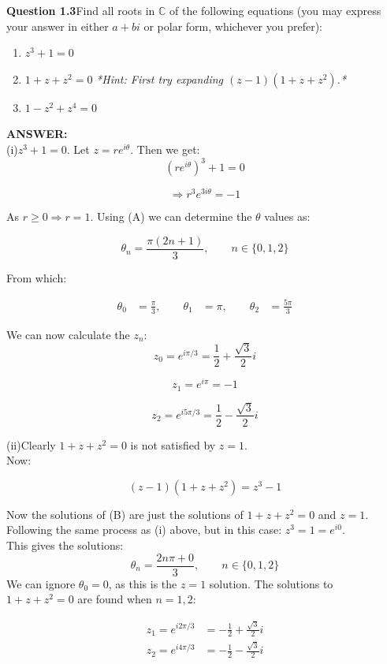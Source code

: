 \documentclass[12pt,a4paper]{article}
\newcommand{\answer}{\vspace{3\baselineskip}\textbf{ANSWER:}}
\newcommand{\question}[2]{\textbf{Question #1}\quad #2}
\begin{document}
\newpage

\question{1.3}{Find all roots in $\mathbb{C}$ of the following equations (you may express your answer in either $a+bi$ or polar form, whichever you prefer):

\begin{enumerate}
\item[(i)] $z^3+1=0$
\item[(ii)] $1+z+z^2=0$ \qquad \emph{*Hint: First try expanding $(z-1)(1+z+z^2)$.*}
\item[(iii)] $1-z^2+z^4=0$
\end{enumerate}

}

\answer \\
(i)\quad $z^3+1=0$.  Let $z=re^{i\theta}$.  Then we get:
\[
(re^{i\theta})^3+1=0
\]

\[
\Rightarrow r^3e^{3i\theta}=-1 \tag{A}
\]

As $r \ge 0 \Rightarrow r=1$.  Using (A) we can determine the $\theta$ values as:

\[
\theta_n=\frac{\pi(2n+1)}{3},\qquad n \in \{0,1,2\}
\]

From which:

\[
\begin{aligned}
\theta_0 &= \frac{\pi}{3},\qquad
\theta_1 &= \pi,\qquad
\theta_2 &= \frac{5\pi}{3}
\end{aligned}
\]

We can now calculate the $z_n$:
\[
z_0=e^{i\pi/3}
=\frac12+\frac{\sqrt3}{2}i
\]

\[
z_1=e^{i\pi}=-1
\]

\[
z_2=e^{i5\pi/3}
=\frac12-\frac{\sqrt3}{2}i
\]

(ii)\quad Clearly $1+z+z^2=0$ is not satisfied by $z=1$.\\
Now:

\[
(z-1)(1+z+z^2)=z^3-1 \tag{B}
\]

Now the solutions of (B) are just the solutions of $1+z+z^2 = 0$ and $z=1$.
Following the same process as (i) above, but in this case: $z^3=1=e^{i0}$.\\
This gives the solutions:
\[
\theta_n=\frac{2n\pi + 0}{3},\qquad n \in \{0,1,2\}
\]
We can ignore $\theta_0 = 0$, as this is the $z=1$ solution.  The solutions to $1+z+z^2=0$
are found when $n=1,2$:

\[
\begin{aligned}
z_1=e^{i2\pi/3} &= -\frac12+\frac{\sqrt3}{2}i \\
z_2=e^{i4\pi/3} &= -\frac12-\frac{\sqrt3}{2}i
\end{aligned}
\]
\end{document}
